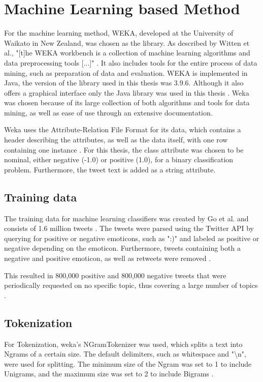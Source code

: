 \section{Machine Learning based Method}

For the machine learning method, WEKA, developed at the University of Waikato in New Zealand, was chosen as the library. As described by Witten et al., "[t]he WEKA workbench is a collection of machine learning algorithms and data preprocessing tools [...]" \cite[p.~7]{weka}. It also includes tools for the entire process of data mining, such as preparation of data and evaluation. WEKA is implemented in Java, the version of the library used in this thesis was 3.9.6. Although it also offers a graphical interface only the Java library was used in this thesis \cite{weka}. Weka was chosen because of its large collection of both algorithms and tools for data mining, as well as ease of use through an extensive documentation.

Weka uses the Attribute-Relation File Format for its data, which contains a header describing the attributes, as well as the data itself, with one row containing one instance \cite{weka}. For this thesis, the class attribute was chosen to be nominal, either negative (-1.0) or positive (1.0), for a binary classification problem. Furthermore, the tweet text is added as a string attribute.

\subsection{Training data}
The training data for machine learning classifiers was created by Go et al. and consists of 1.6 million tweets \cite{GoBHaHua2009}. The tweets were parsed using the Twitter API by querying for positive or negative emoticons, such as ":)" and labeled as positive or negative depending on the emoticon. Furthermore, tweets containing both a negative and positive emoticon, as well as retweets were removed \cite{GoBHaHua2009}.

This resulted in 800,000 positive and 800,000 negative tweets that were periodically requested on no specific topic, thus covering a large number of topics \cite{GoBHaHua2009}.


\subsection{Tokenization}
For Tokenization, weka's NGramTokenizer was used, which splits a text into Ngrams of a certain size. The default delimiters, such as whitespace and "\textbackslash n", were used for splitting. The minimum size of the Ngram was set to 1 to include Unigrams, and the maximum size was set to 2 to include Bigrams \cite{weka}.
